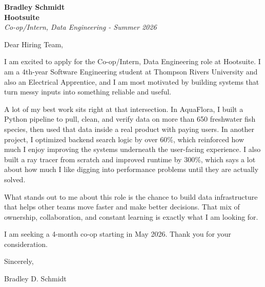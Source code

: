 \documentclass[11pt]{article}
\begin{document}
\textbf{Bradley Schmidt}\\
\vspace{0.5em}
\textbf{Hootsuite}\\
\textit{Co-op/Intern, Data Engineering - Summer 2026}

Dear Hiring Team,

\par

I am excited to apply for the Co-op/Intern, Data Engineering role at Hootsuite. I am a 4th-year Software Engineering student at Thompson Rivers University and also an Electrical Apprentice, and I am most motivated by building systems that turn messy inputs into something reliable and useful.

\par

A lot of my best work sits right at that intersection. In AquaFlora, I built a Python pipeline to pull, clean, and verify data on more than 650 freshwater fish species, then used that data inside a real product with paying users. In another project, I optimized backend search logic by over 60\%, which reinforced how much I enjoy improving the systems underneath the user-facing experience. I also built a ray tracer from scratch and improved runtime by 300\%, which says a lot about how much I like digging into performance problems until they are actually solved.

\par

What stands out to me about this role is the chance to build data infrastructure that helps other teams move faster and make better decisions. That mix of ownership, collaboration, and constant learning is exactly what I am looking for.

\par

I am seeking a 4-month co-op starting in May 2026. Thank you for your consideration.

\par

Sincerely,

\par

Bradley D. Schmidt
\end{document}
